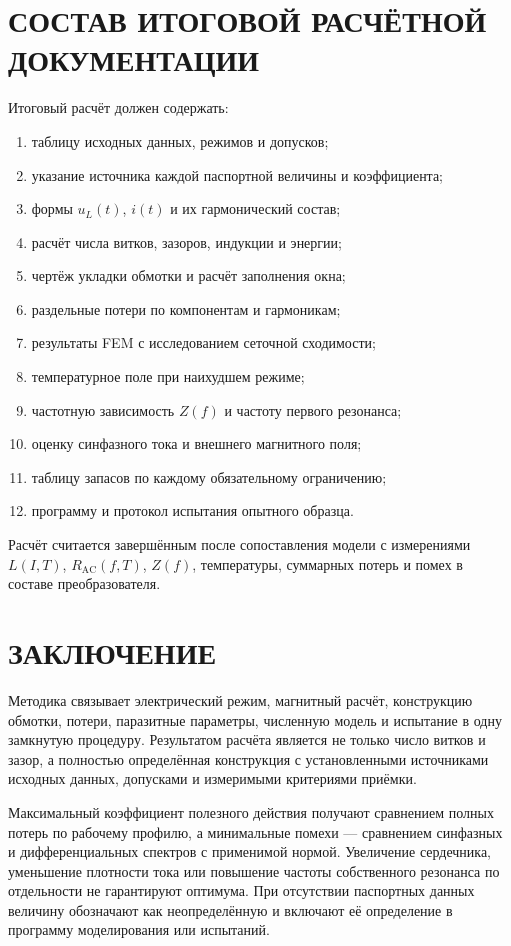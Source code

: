 \documentclass[14pt,a4paper]{extarticle}
\begin{document}
\section{СОСТАВ ИТОГОВОЙ РАСЧЁТНОЙ ДОКУМЕНТАЦИИ}

Итоговый расчёт должен содержать:
\begin{enumerate}
 \item таблицу исходных данных, режимов и допусков;
 \item указание источника каждой паспортной величины и коэффициента;
 \item формы $u_L(t)$, $i(t)$ и их гармонический состав;
 \item расчёт числа витков, зазоров, индукции и энергии;
 \item чертёж укладки обмотки и расчёт заполнения окна;
 \item раздельные потери по компонентам и гармоникам;
 \item результаты FEM с исследованием сеточной сходимости;
 \item температурное поле при наихудшем режиме;
 \item частотную зависимость $Z(f)$ и частоту первого резонанса;
 \item оценку синфазного тока и внешнего магнитного поля;
 \item таблицу запасов по каждому обязательному ограничению;
 \item программу и протокол испытания опытного образца.
\end{enumerate}

Расчёт считается завершённым после сопоставления модели с измерениями
$L(I,T)$, $R_{\text{AC}}(f,T)$, $Z(f)$, температуры, суммарных потерь и
помех в составе преобразователя.

\section{ЗАКЛЮЧЕНИЕ}

Методика связывает электрический режим, магнитный расчёт, конструкцию
обмотки, потери, паразитные параметры, численную модель и испытание в одну
замкнутую процедуру. Результатом расчёта является не только число витков и
зазор, а полностью определённая конструкция с установленными источниками
исходных данных, допусками и измеримыми критериями приёмки.

Максимальный коэффициент полезного действия получают сравнением полных
потерь по рабочему профилю, а минимальные помехи --- сравнением синфазных и
дифференциальных спектров с применимой нормой. Увеличение сердечника,
уменьшение плотности тока или повышение частоты собственного резонанса по
отдельности не гарантируют оптимума. При отсутствии паспортных данных
величину обозначают как неопределённую и включают её определение в программу
моделирования или испытаний.
\end{document}
